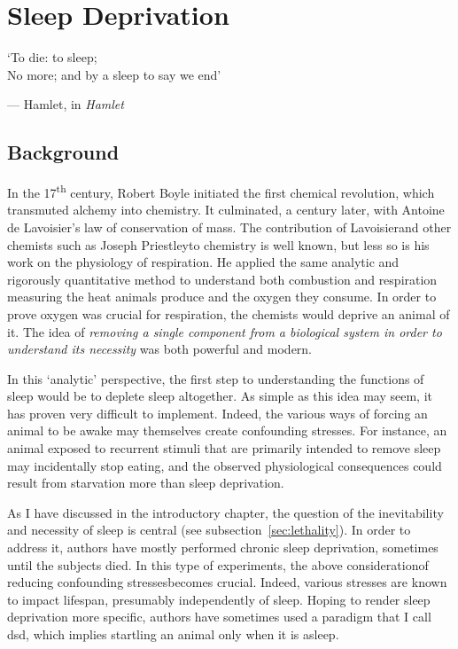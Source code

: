 \edef\figdir{\currfiledir/fig}
 	
\chapter{Sleep Deprivation} \label{sleep-deprivation}


\epigraph{
	`To die: to sleep; \\
   	No more; and by a sleep to say we end'}{--- Hamlet, in \emph{Hamlet}~\cite[Act III, Scene 1]{shakespeare_hamlet_1905}}

\section{Background}


In the 17\textsuperscript{th} century, Robert Boyle initiated the first chemical revolution, which transmuted alchemy into chemistry.
It culminated, a century later, with Antoine de Lavoisier's law of conservation of mass.
The contribution of Lavoisier\emd{}and other chemists such as Joseph Priestley\emd{}to chemistry is well known, but less so is his work on the physiology of respiration\cite{karamanou_antoine-laurent_2013}.
He applied the same analytic and rigorously quantitative method to understand both combustion and respiration\emd{}\ie{} measuring the heat animals produce and the oxygen they consume.
In order to prove oxygen was crucial for respiration, the chemists would deprive an animal of it\cite{underwood_lavoisier_1944}.
The idea of \emph{removing a single component from a biological system in order to understand its necessity} was both powerful and modern.


In this `analytic' perspective, the first step to understanding the functions of sleep would be to deplete sleep altogether.
As simple as this idea may seem, it has proven very difficult to implement.
Indeed, the various ways of forcing an animal to be awake may themselves create confounding stresses.
For instance, an animal exposed to recurrent stimuli that are primarily intended to remove sleep may incidentally stop eating, and the observed physiological consequences could result from starvation more than sleep deprivation.

As I have discussed in the introductory chapter, the question of the inevitability and necessity of sleep is central (see subsection~\ref{sec:lethality}).
In order to address it, authors have mostly performed chronic sleep deprivation, sometimes until the subjects died.
In this type of experiments, the above consideration\emd{}of reducing confounding stresses\emd{}becomes crucial.
Indeed, various stresses are known to impact lifespan, presumably independently of sleep.
Hoping to render sleep deprivation more specific, authors have sometimes used a paradigm that I call \gls{dsd}, which implies startling an animal 
only when it is asleep.


